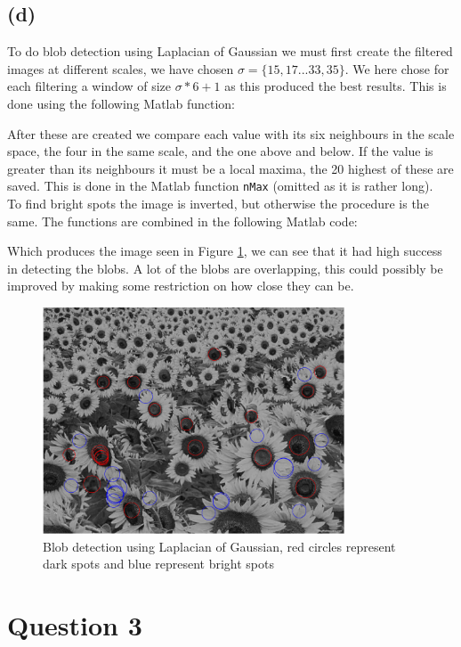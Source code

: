 \documentclass[a4paper]{article}
\begin{document}
\subsection*{(d)}
To do blob detection using Laplacian of Gaussian we must first create the filtered images at different scales, we have chosen $\sigma = \{15,17...33,35\}$. We here chose for each filtering a window of size $\sigma*6 + 1$ as this produced the best results. This is done using the following Matlab function:

After these are created we compare each value with its six neighbours in the scale space, the four in the same scale, and the one above and below. If the value is greater than its neighbours it must be a local maxima, the 20 highest of these are saved. This is done in the  Matlab function \texttt{nMax} (omitted as it is rather long).\\
%
To find bright spots the image is inverted, but otherwise the procedure is the same. The functions are combined in the following Matlab code:

Which produces the image seen in Figure \ref{2d}, we can see that it had high success in detecting the blobs. A lot of the blobs are overlapping, this could possibly be improved by making some restriction on how close they can be.
\begin{figure}[H]
  \centering
  \includegraphics[width=0.8\textwidth]{./2d.pdf}
  \caption{Blob detection using Laplacian of Gaussian, red circles represent dark spots and blue represent bright spots}
  \label{2d}
\end{figure}
\section*{Question 3}
\end{document}
